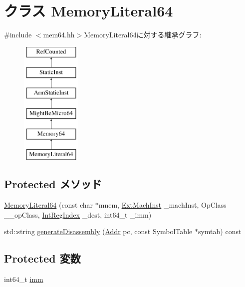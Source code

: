 \hypertarget{classArmISA_1_1MemoryLiteral64}{
\section{クラス MemoryLiteral64}
\label{classArmISA_1_1MemoryLiteral64}
}


{\ttfamily \#include $<$mem64.hh$>$}MemoryLiteral64に対する継承グラフ:\begin{figure}[H]
\begin{center}
\leavevmode
\includegraphics[height=6cm]{classArmISA_1_1MemoryLiteral64}
\end{center}
\end{figure}
\subsection*{Protected メソッド}
\begin{DoxyCompactItemize}
\item 
\hyperlink{classArmISA_1_1MemoryLiteral64_a7025e91fe637b31678be253b3d3e6f69}{MemoryLiteral64} (const char $\ast$mnem, \hyperlink{classStaticInst_a5605d4fc727eae9e595325c90c0ec108}{ExtMachInst} \_\-machInst, OpClass \_\-\_\-opClass, \hyperlink{namespaceArmISA_ae64680ba9fb526106829d6bf92fc791b}{IntRegIndex} \_\-dest, int64\_\-t \_\-imm)
\item 
std::string \hyperlink{classArmISA_1_1MemoryLiteral64_a95d323a22a5f07e14d6b4c9385a91896}{generateDisassembly} (\hyperlink{classm5_1_1params_1_1Addr}{Addr} pc, const SymbolTable $\ast$symtab) const 
\end{DoxyCompactItemize}
\subsection*{Protected 変数}
\begin{DoxyCompactItemize}
\item 
int64\_\-t \hyperlink{classArmISA_1_1MemoryLiteral64_a11b34c3ceec32cc1f14d0ca9c099c470}{imm}
\end{DoxyCompactItemize}


